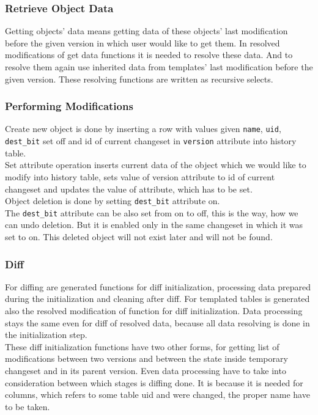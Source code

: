 \documentclass[deska]{subfiles}
\begin{document}
\subsubsection{Retrieve Object Data}
Getting objects' data means getting data of these objects' last modification before the given version in which user would like to get them.
In resolved modifications of get data functions it is needed to resolve these data. And to resolve them again use inherited data from templates' last modification before the given version.
These resolving functions are written as recursive selects.

\subsubsection{Performing Modifications}
Create new object is done by inserting a row with values given {\tt name}, {\tt uid}, {\tt dest\_bit} set off and id of current changeset in {\tt version} attribute into history table.\\
Set attribute operation inserts current data of the object which we would like to modify into history table, sets value of version attribute to id of current changeset and updates the value of attribute, which has to be set.\\
Object deletion is done by setting {\tt dest\_bit} attribute on.\\
The {\tt dest\_bit} attribute can be also set from on to off, this is the way, how we can undo deletion. But it is enabled only in the same changeset in which it was set to on. This deleted object will not exist later and will not be found.

\subsubsection{Diff}
For diffing are generated functions for diff initialization, processing data prepared during the initialization and cleaning after diff. For templated tables is generated also the resolved modification of function for diff initialization. Data processing stays the same even for diff of resolved data, because all data resolving is done in the initialization step.\\
These diff initialization functions have two other forms, for getting list of modifications between two versions and between the state inside temporary changeset and in its parent version. Even data processing have to take into consideration between which stages is diffing done. It is because it is needed for columns, which refers to some table uid and were changed, the proper name have to be taken.
\end{document}
